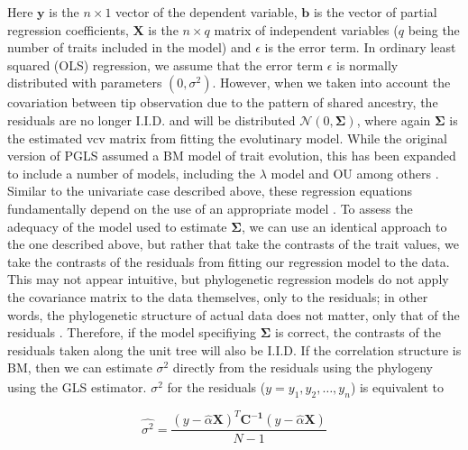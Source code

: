 \documentclass[a4paper,12pt]{article}
\begin{document}
Here $\mathbf{y}$ is the $n \times 1$ vector of the dependent variable, $\mathbf{b}$ is the vector of partial regression coefficients, $\mathbf{X}$ is the $n \times q$ matrix of independent variables ($q$ being the number of traits included in the model) and $\epsilon$ is the error term. In ordinary least squared (OLS) regression, we assume that the error term $\epsilon$ is normally distributed with parameters $(0, \sigma^2)$. However, when we taken into account the covariation between tip observation due to the pattern of shared ancestry, the residuals are no longer I.I.D. and will be distributed $\mathcal{N} (0, \mathbf{\Sigma})$, where again $\mathbf{\Sigma}$ is the estimated vcv matrix from fitting the evolutinary model. While the original version of PGLS assumed a BM model of trait evolution, this has been expanded to include a number of models, including the $\lambda$ model \citep{Pagel1997, Revell2010, Freckleton2011} and OU \citep[e.g.][]{Hansen2008} among others \citep[see also][]{Lynch1991, Hadfield2010}. Similar to the univariate case described above, these regression equations fundamentally depend on the use of an appropriate model \citep{Hansen2012}. To assess the adequacy of the model used to estimate $\mathbf{\Sigma}$, we can use an identical approach to the one described above, but rather that take the contrasts of the trait values, we take the contrasts of the residuals from fitting our regression model to the data. This may not appear intuitive, but phylogenetic regression models do not apply the covariance matrix to the data themselves, only to the residuals; in other words, the phylogenetic structure of actual data does not matter, only that of the residuals \citep{Rohlf2001, Revell2010}. Therefore, if the model specifiying $\mathbf{\Sigma}$ is correct, the contrasts of the residuals taken along the unit tree will also be I.I.D. If the correlation structure is BM, then we can estimate $\sigma^2$ directly from the residuals using the phylogeny using the GLS estimator. $\hat{\sigma^2}$ for the residuals ($y = y_1, y_2, \ldots , y_n$) is equivalent to

\begin{equation}
\hat{\sigma^2} = \frac{(y - \hat{\alpha}\mathbf{X})^T \mathbf{C^{-1}} (y - \hat{\alpha}\mathbf{X})}{N-1} 
\end{equation}
\end{document}
